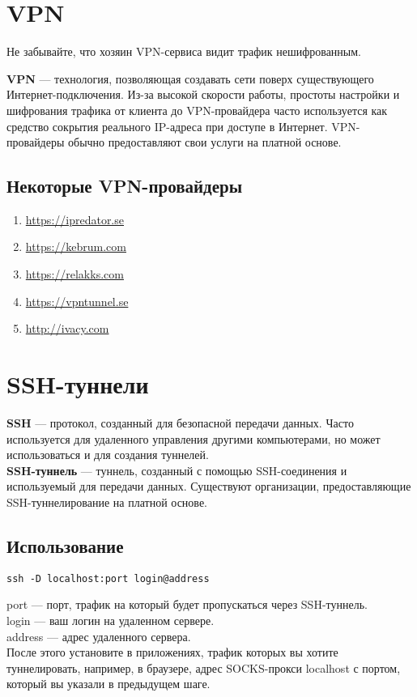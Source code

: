 \section{VPN}
\begin{important}
Не забывайте, что хозяин VPN-сервиса видит трафик нешифрованным.
\end{important}
\textbf{VPN} --- технология, позволяющая создавать сети поверх существующего Интернет-подключения. Из-за высокой скорости работы, простоты настройки и шифрования трафика от клиента до VPN-провайдера часто используется как средство сокрытия реального IP-адреса при доступе в Интернет. VPN-провайдеры обычно предоставляют свои услуги на платной основе.
\subsection{Некоторые VPN-провайдеры}
\begin{enumerate}
\item \url{https://ipredator.se}
\item \url{https://kebrum.com}
\item \url{https://relakks.com}
\item \url{https://vpntunnel.se}
\item \url{http://ivacy.com}
\end{enumerate}

\section{SSH-туннели}
\textbf{SSH} --- протокол, созданный для безопасной передачи данных. Часто используется для удаленного управления другими компьютерами, но может использоваться и для создания туннелей.\\
\textbf{SSH-туннель} --- туннель, созданный с помощью SSH-соединения и используемый для передачи данных. Существуют организации, предоставляющие SSH-туннелирование на платной основе.
\subsection{Использование}
\begin{lstlisting}
ssh -D localhost:port login@address
\end{lstlisting}
port --- порт, трафик на который будет пропускаться через SSH-туннель.\\
login --- ваш логин на удаленном сервере.\\
address --- адрес удаленного сервера.\\
После этого установите в приложениях, трафик которых вы хотите туннелировать, например, в браузере, адрес SOCKS-прокси localhost с портом, который вы указали в предыдущем шаге.
